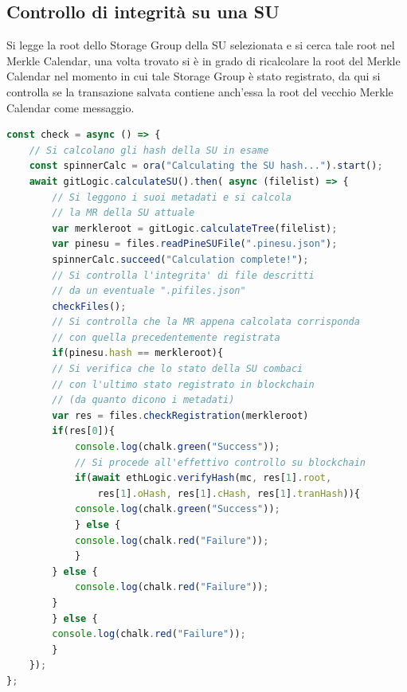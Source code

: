 \subsection{Controllo di integrità su una SU}
Si legge la root dello Storage Group della SU selezionata e si cerca tale root nel Merkle Calendar, una volta trovato si è in grado di ricalcolare la root del Merkle Calendar nel momento in cui tale Storage Group è stato registrato, da qui si controlla se la transazione salvata contiene anch'essa la root del vecchio Merkle Calendar come messaggio.

\newpage

\begin{lstlisting}[language=JavaScript]
const check = async () => {
    // Si calcolano gli hash della SU in esame
    const spinnerCalc = ora("Calculating the SU hash...").start();
    await gitLogic.calculateSU().then( async (filelist) => {
        // Si leggono i suoi metadati e si calcola
        // la MR della SU attuale
        var merkleroot = gitLogic.calculateTree(filelist);
        var pinesu = files.readPineSUFile(".pinesu.json");
        spinnerCalc.succeed("Calculation complete!");
        // Si controlla l'integrita' di file descritti
        // da un eventuale ".pifiles.json"
        checkFiles();
        // Si controlla che la MR appena calcolata corrisponda
        // con quella precedentemente registrata
        if(pinesu.hash == merkleroot){
        // Si verifica che lo stato della SU combaci
        // con l'ultimo stato registrato in blockchain
        // (da quanto dicono i metadati)
        var res = files.checkRegistration(merkleroot)
        if(res[0]){
            console.log(chalk.green("Success"));
            // Si procede all'effettivo controllo su blockchain
            if(await ethLogic.verifyHash(mc, res[1].root,
                res[1].oHash, res[1].cHash, res[1].tranHash)){
            console.log(chalk.green("Success"));
            } else {
            console.log(chalk.red("Failure"));
            }
        } else {
            console.log(chalk.red("Failure"));
        }
        } else {
        console.log(chalk.red("Failure"));
        }
    });
};
\end{lstlisting}